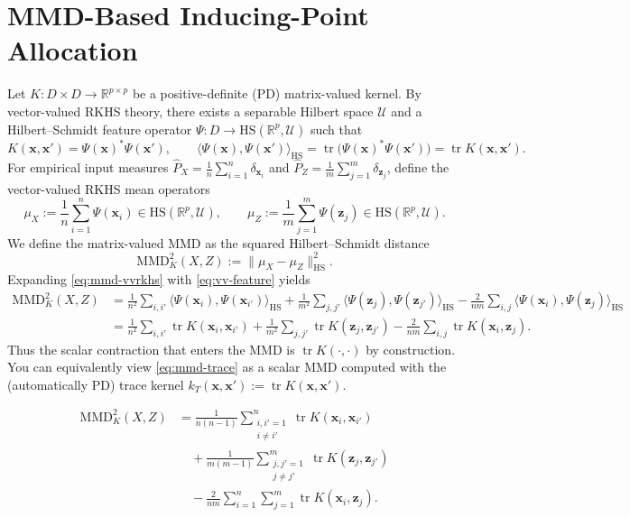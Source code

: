 \documentclass[11pt,a4paper]{article}
\newcommand{\bx}{\boldsymbol{x}}
\newcommand{\bz}{\boldsymbol{z}}
\begin{document}
\section{MMD-Based Inducing-Point Allocation}\label{subsec:MMD-comp}
Let $K:D\times D\to\mathbb R^{p\times p}$ be a positive-definite (PD) matrix-valued kernel. By vector-valued RKHS theory, there exists a separable Hilbert space $\mathcal U$ and a Hilbert–Schmidt feature operator $\Psi:D\to \mathrm{HS}(\mathbb R^p,\mathcal U)$ such that
\begin{equation}K(\bx,\bx')=\Psi(\bx)^\ast \Psi(\bx'),\qquad \langle \Psi(\bx),\Psi(\bx')\rangle_{\mathrm{HS}}=\operatorname{tr}\!\big(\Psi(\bx)^\ast \Psi(\bx')\big)=\operatorname{tr}K(\bx,\bx'). \label{eq:vv-feature}\end{equation}
For empirical input measures $\hat P_X=\frac1n\sum_{i=1}^n\delta_{\bx_i}$ and $\hat P_Z=\frac1m\sum_{j=1}^m\delta_{\bz_j}$, define the vector-valued RKHS {mean operators}
\begin{displaymath}\mu_X:=\frac1n\sum_{i=1}^n \Psi(\bx_i)\in \mathrm{HS}(\mathbb R^p,\mathcal U), \qquad \mu_Z:=\frac1m\sum_{j=1}^m \Psi(\bz_j)\in \mathrm{HS}(\mathbb R^p,\mathcal U).\end{displaymath}
We define the matrix-valued MMD as the squared Hilbert–Schmidt distance
\begin{equation}\mathrm{MMD}^2_K(X,Z):=\|\mu_X-\mu_Z\|_{\mathrm{HS}}^2. \label{eq:mmd-vvrkhs}\end{equation}
Expanding \eqref{eq:mmd-vvrkhs} with \eqref{eq:vv-feature} yields
\begin{align}
\mathrm{MMD}^2_K(X,Z)
&= \frac{1}{n^2}\!\sum_{i,i'} \langle \Psi(\bx_i),\Psi(\bx_{i'})\rangle_{\mathrm{HS}}
 + \frac{1}{m^2}\!\sum_{j,j'} \langle \Psi(\bz_j),\Psi(\bz_{j'})\rangle_{\mathrm{HS}}
 - \frac{2}{nm}\!\sum_{i,j} \langle \Psi(\bx_i),\Psi(\bz_j)\rangle_{\mathrm{HS}} \nonumber\\
&= \frac{1}{n^2}\!\sum_{i,i'} \operatorname{tr}K(\bx_i,\bx_{i'})
 + \frac{1}{m^2}\!\sum_{j,j'} \operatorname{tr}K(\bz_j,\bz_{j'})
 - \frac{2}{nm}\!\sum_{i,j} \operatorname{tr}K(\bx_i,\bz_j).
\label{eq:mmd-trace}
\end{align}
{Thus the scalar contraction that enters the MMD is $\operatorname{tr}K(\cdot,\cdot)$ by construction.} You can equivalently view \eqref{eq:mmd-trace} as a scalar MMD computed with the (automatically PD) {trace kernel} $k_T(\bx,\bx'):=\operatorname{tr}K(\bx,\bx')$.

\begin{align*}
\mathrm{MMD}^2_K(X,Z)
&=\frac{1}{n(n-1)}
  \sum_{\substack{i,i'=1\\ i\neq i'}}^{n}
  \operatorname{tr}K(\bx_i,\bx_{i'}) \\
&\quad+\frac{1}{m(m-1)}
  \sum_{\substack{j,j'=1\\ j\neq j'}}^{m}
  \operatorname{tr}K(\bz_j,\bz_{j'}) \\
&\quad-\frac{2}{nm}
  \sum_{i=1}^{n}\sum_{j=1}^{m}
  \operatorname{tr}K(\bx_i,\bz_j).
\end{align*}
\end{document}
